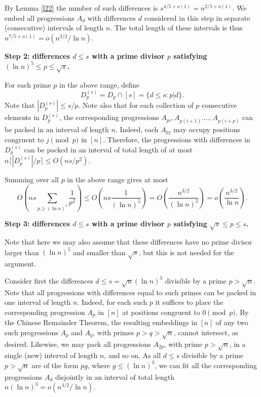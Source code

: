 \documentclass[12pt]{amsart}
\theoremstyle{plain}
\numberwithin{equation}{section}
\begin{document}
\noindent
By Lemma \ref{l22} the number of such differences is $s^{4/5+o(1)} =n^{2/5+o(1)}$. 
We embed all progressions $A_d$ with differences $d$ considered in this step in 
separate (consecutive) intervals of length $n$.
The total length of these intervals is thus 
$n^{7/5+o(1)}=o(n^{3/2}/ \ln n)$.
\vspace{0.2cm}

\noindent
{\bf Step 2: differences $d \leqslant s$ with a prime divisor $p$ satisfying
	$(\ln n)^5 \leqslant p \leqslant \sqrt s$.}
\vspace{0.1cm}

\noindent
For each prime $p$ in the above range, define $$D_p^{(s)}=D_p\cap [s]=\{d \leqslant s: p| d\}.$$ Note that $|D_p^{(s)}| \leqslant s/p$. Note also that for each collection of $p$ consecutive elements in $D_p^{(s)}$, the corresponding progressions $A_{pi},A_{p(i+1)}.\ldots,A_{p(i+p)}$ can be packed in an interval of length $n$. Indeed, each $A_{pj}$ may occupy positions congruent to $j\pmod p$ in $[n]$. Therefore, the progressions with differences in $D_p^{(s)}$ can be packed in an interval of total length of at most $n \lceil |D_p^{(s)}|/p \rceil \leqslant O(ns/p^2)$.

Summing over all $p$ in the above range gives at most
$$
O\left(ns \sum_{p \geqslant (\ln n)^5} \frac{1}{p^2}\right) \leqslant
O\left(ns \frac{1}{(\ln n)^5}\right) 
= O\left(\frac{n^{3/2}}{(\ln n)^2}\right)
=o\left(\frac{n^{3/2}}{\ln n}\right).
$$
\vspace{0.2cm}

\noindent
{\bf Step 3: differences $d \leqslant s$ with a prime divisor $p$ satisfying $\sqrt s \leqslant p \leqslant s$.}
\vspace{0.1cm}

\noindent
Note that here we may also assume that these differences have no prime divisor larger than $(\ln n)^5$ and smaller than $\sqrt s$, but this is not needed for the argument.

	Consider first the differences $d \leqslant s=\sqrt n (\ln n)^3$ divisible by a prime $p>\sqrt n$. 
	Note that all progressions with differences equal to such primes can be packed in one interval of length $n$. Indeed, for each such $p$ it suffices to place the corresponding progression $A_p$ in $[n]$ at positions congruent to $0\pmod p$. 
	By the Chinese Remainder Theorem, the resulting embeddings in $[n]$ of any two such progressions 
	$A_p$ and $A_q$, with primes $p>q>\sqrt n$, cannot intersect, as desired.
	Likewise, we may pack all progressions $A_{2p}$, with prime $p>\sqrt n$, in a single (new) interval of length $n$, and so on. As all $d\leqslant s$ divisible by   a prime $p>\sqrt n$ are of the form $pg$, where 
	$g\leqslant (\ln n)^3$, we can fit all the corresponding progressions $A_d$ disjointly in an interval of total length $n(\ln n)^3=o(n^{3/2}/\ln n)$.
	
\end{document}
